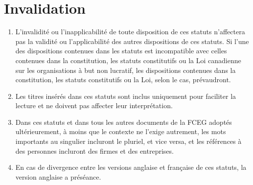 \section{Invalidation}
\label{invalidation}

\begin{enumerate}
 \item L'invalidité ou l'inapplicabilité de toute disposition de ces statuts n'affectera pas la validité ou l'applicabilité des autres dispositions de ces statuts. Si l'une des dispositions contenues dans les statuts est incompatible avec celles contenues dans la constitution, les statuts constitutifs ou la Loi canadienne sur les organisations à but non lucratif, les dispositions contenues dans la constitution, les statuts constitutifs ou la Loi, selon le cas, prévaudront.
 \item Les titres insérés dans ces statuts sont inclus uniquement pour faciliter la lecture et ne doivent pas affecter leur interprétation.
 \item Dans ces statuts et dans tous les autres documents de la FCEG adoptés ultérieurement, à moins que le contexte ne l'exige autrement, les mots importants au singulier incluront le pluriel, et vice versa, et les références à des personnes incluront des firmes et des entreprises.
 \item En cas de divergence entre les versions anglaise et française de ces statuts, la version anglaise a préséance.
\end{enumerate}

